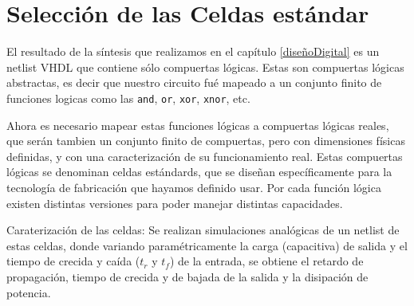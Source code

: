 


\section{Selección de las Celdas estándar}\label{celdasEstandars}
El resultado de la síntesis que realizamos en el capítulo \ref{diseñoDigital} es un netlist VHDL que contiene sólo compuertas lógicas. Estas son compuertas lógicas abstractas, es decir que nuestro circuito fué mapeado a un conjunto finito de funciones logicas como las \verb.and., \verb.or., \verb.xor., \verb.xnor., etc.

Ahora es necesario mapear estas funciones lógicas a compuertas lógicas reales, que serán tambien un conjunto finito de compuertas, pero con dimensiones físicas definidas, y con una caracterización de su funcionamiento real. Estas compuertas lógicas se denominan celdas estándards, que se diseñan específicamente para la tecnología de fabricación que hayamos definido usar. Por cada función lógica existen distintas versiones para poder manejar distintas capacidades. 

Caraterización de las celdas: Se realizan simulaciones analógicas de un netlist de estas celdas, donde variando paramétricamente la carga (capacitiva) de salida y el tiempo de crecida y caída ($t_r$ y $t_f$) de la entrada, se obtiene el retardo de propagación, tiempo de crecida y de bajada de la salida y la disipación de potencia.


